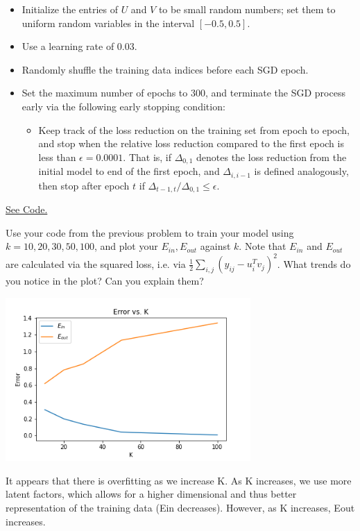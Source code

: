 \begin{itemize}
\item Initialize the entries of $U$ and $V$ to be small random numbers; set them to uniform random variables in the interval $[-0.5, 0.5]$.
\item Use a learning rate of 0.03.
\item Randomly shuffle the training data indices before each SGD epoch.
\item Set the maximum number of epochs to 300, and terminate the SGD process early via the following early stopping condition:
\begin{itemize}
\item Keep track of the loss reduction on the training set from epoch to epoch, and stop when the relative loss reduction compared to the first epoch is less than $\epsilon = 0.0001$.  That is, if $\Delta_{0,1}$ denotes the loss reduction from the initial model to end of the first epoch, and $\Delta_{i, i-1}$ is defined analogously, then stop after epoch $t$ if $\Delta_{t-1,t} / \Delta_{0,1} \leq \epsilon$.
\end{itemize}
\end{itemize}

\begin{solution}
	\href{https://colab.research.google.com/drive/1sr3nFXHRyPBuR50AuB6KvmMLRfFsGCHo}{See Code.}
\end{solution}

\problem[5]
Use your code from the previous problem to train your model using $k=10, 20, 30, 50, 100$, and plot your $E_{in}, E_{out}$ against $k$. Note that $E_{in}$ and $E_{out}$ are calculated via the squared loss, i.e. via $\frac{1}{2}\sum_{i,j} \left( y_{ij} - u_i^Tv_j\right)^2$. What trends do you notice in the plot? Can you explain them?

\begin{solution}
	\begin{center}
		\includegraphics[width=0.7\textwidth]{2d.png}
	\end{center}
	It appears that there is overfitting as we increase K. As K increases, we use more latent factors, which allows for a higher dimensional and thus better representation of the training data (Ein decreases). However, as K increases, Eout increases.
\end{solution}

